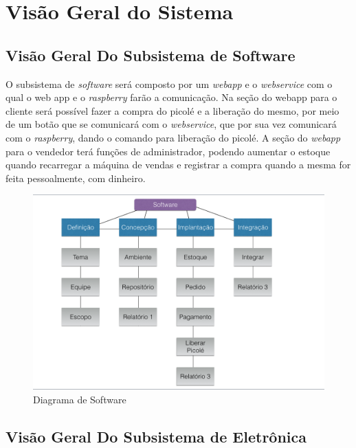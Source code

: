\chapter{Visão Geral do Sistema}

\section{Visão Geral Do Subsistema de Software}

O subsistema de \textit{software} será composto por um \textit{webapp} e o \textit{webservice} com o qual o web app e o \textit{raspberry} farão a comunicação. Na seção do webapp para o cliente será possível fazer a compra do picolé e a liberação do mesmo, por meio de um botão que se comunicará com o \textit{webservice}, que por sua vez comunicará com o \textit{raspberry}, dando o comando para liberação do picolé. A seção do \textit{webapp} para o vendedor terá funções de administrador, podendo aumentar o estoque quando recarregar a máquina de vendas e registrar a compra quando a mesma for feita pessoalmente, com dinheiro. 

\begin{figure}[H]
	\centering
    \includegraphics[width=\textwidth]{figuras/vg_software}
    \caption{Diagrama de Software}
    \label{fig:vg_software}
\end{figure}




\section{Visão Geral Do Subsistema de Eletrônica}

